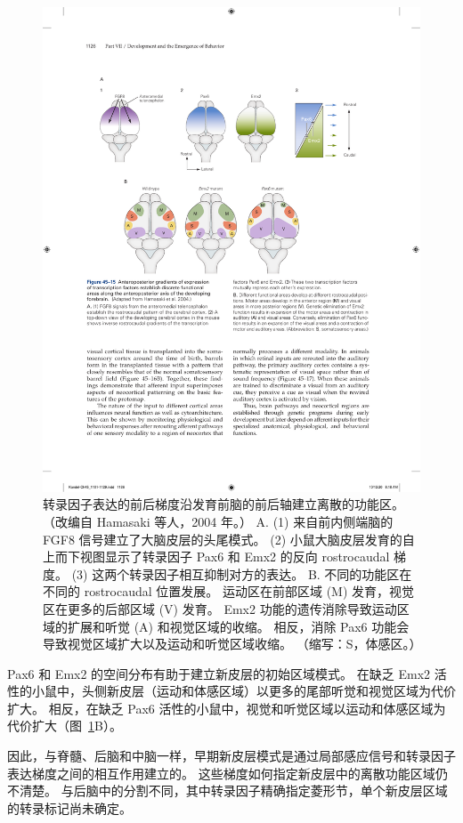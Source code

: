 \begin{figure}[htbp]
	\centering
	\includegraphics[width=0.9\linewidth]{chap45/fig_45_15}
	\caption{转录因子表达的前后梯度沿发育前脑的前后轴建立离散的功能区。 （改编自 Hamasaki 等人，2004 年。） A. (1) 来自前内侧端脑的 FGF8 信号建立了大脑皮层的头尾模式。 (2) 小鼠大脑皮层发育的自上而下视图显示了转录因子 Pax6 和 Emx2 的反向 rostrocaudal 梯度。 (3) 这两个转录因子相互抑制对方的表达。 B. 不同的功能区在不同的 rostrocaudal 位置发展。 运动区在前部区域 (M) 发育，视觉区在更多的后部区域 (V) 发育。 Emx2 功能的遗传消除导致运动区域的扩展和听觉 (A) 和视觉区域的收缩。 相反，消除 Pax6 功能会导致视觉区域扩大以及运动和听觉区域收缩。 （缩写：S，体感区。）}
	\label{fig:45_15}
\end{figure}


Pax6 和 Emx2 的空间分布有助于建立新皮层的初始区域模式。
在缺乏 Emx2 活性的小鼠中，头侧新皮层（运动和体感区域）以更多的尾部听觉和视觉区域为代价扩大。
相反，在缺乏 Pax6 活性的小鼠中，视觉和听觉区域以运动和体感区域为代价扩大（图~\ref{fig:45_15}B）。


因此，与脊髓、后脑和中脑一样，早期新皮层模式是通过局部感应信号和转录因子表达梯度之间的相互作用建立的。
这些梯度如何指定新皮层中的离散功能区域仍不清楚。
与后脑中的分割不同，其中转录因子精确指定菱形节，单个新皮层区域的转录标记尚未确定。



